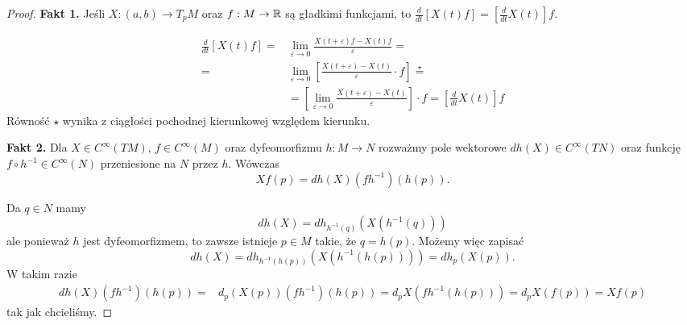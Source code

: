 \begin{proof}
  \textbf{Fakt 1.} Jeśli $X:(a,b)\to T_pM$ oraz $f:M\to \mathbb{R}$ są gładkimi funkcjami, to $\frac{d}{dt}[X(t)f]=[\frac{d}{dt}X(t)]f$.

  \begin{align*}
    \frac{d}{dt}[X(t)f]=&\lim_{\varepsilon\to 0}\frac{X(t+\varepsilon)f-X(t)f}{\varepsilon}=\\
    =&\lim_{\varepsilon\to 0}\left[\frac{X(t+\varepsilon)-X(t)}{\varepsilon}\cdot f\right]\overset{\star}{=}\\
     &=\left[\lim_{\varepsilon\to0}\frac{X(t+\varepsilon)-X(t)}{\varepsilon}\right]\cdot f=\left[\frac{d}{dt}X(t)\right]f
  \end{align*}
  Równość $\star$ wynika z ciągłości pochodnej kierunkowej względem kierunku.

  \textbf{Fakt 2.} Dla $X\in C^\infty(TM)$, $f\in C^\infty(M)$ oraz dyfeomorfizmu $h:M\to N$ rozważmy pole wektorowe $dh(X)\in C^\infty(TN)$ oraz funkcję $f\circ h^{-1}\in C^\infty(N)$ przeniesione na $N$ przez $h$. Wówczas
    $$Xf(p)=dh(X)(fh^{-1})(h(p)).$$

    


    Da $q\in N$ mamy
    $$dh(X)=dh_{h^{-1}(q)}(X(h^{-1}(q)))$$
    ale ponieważ $h$ jest dyfeomorfizmem, to zawsze istnieje $p\in M$ takie, że $q=h(p)$. Możemy więc zapisać
    $$dh(X)=dh_{h^{-1}(h(p))}(X(h^{-1}(h(p))))=dh_p(X(p)).$$
    W takim razie
    \begin{align*}
      dh(X)(fh^{-1})(h(p))=&d_p(X(p))(fh^{-1})(h(p))=d_pX(fh^{-1}(h(p)))=d_pX(f(p))=Xf(p)
    \end{align*}
    tak jak chcieliśmy.


\end{proof}
